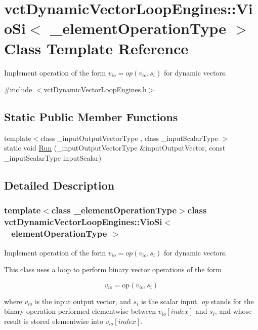 \hypertarget{classvct_dynamic_vector_loop_engines_1_1_vio_si}{}\section{vct\+Dynamic\+Vector\+Loop\+Engines\+:\+:Vio\+Si$<$ \+\_\+element\+Operation\+Type $>$ Class Template Reference}
\label{classvct_dynamic_vector_loop_engines_1_1_vio_si}


Implement operation of the form $ v_{io} = op(v_{io}, s_i)$ for dynamic vectors.  




{\ttfamily \#include $<$vct\+Dynamic\+Vector\+Loop\+Engines.\+h$>$}

\subsection*{Static Public Member Functions}
\begin{DoxyCompactItemize}
\item 
{\footnotesize template$<$class \+\_\+input\+Output\+Vector\+Type , class \+\_\+input\+Scalar\+Type $>$ }\\static void \hyperlink{classvct_dynamic_vector_loop_engines_1_1_vio_si_af3d43b7dd840e50ee26aa953c1312971}{Run} (\+\_\+input\+Output\+Vector\+Type \&input\+Output\+Vector, const \+\_\+input\+Scalar\+Type input\+Scalar)
\end{DoxyCompactItemize}


\subsection{Detailed Description}
\subsubsection*{template$<$class \+\_\+element\+Operation\+Type$>$class vct\+Dynamic\+Vector\+Loop\+Engines\+::\+Vio\+Si$<$ \+\_\+element\+Operation\+Type $>$}

Implement operation of the form $ v_{io} = op(v_{io}, s_i)$ for dynamic vectors. 

This class uses a loop to perform binary vector operations of the form

\[ v_{io} = \mathrm{op}(v_{io}, s_{i}) \]

where $v_{io}$ is the input output vector, and $s_{i}$ is the scalar input. {\itshape op} stands for the binary operation performed elementwise between $v_{io}[index]$ and $s_{i}$, and whose result is stored elementwise into $v_{io}[index]$.


